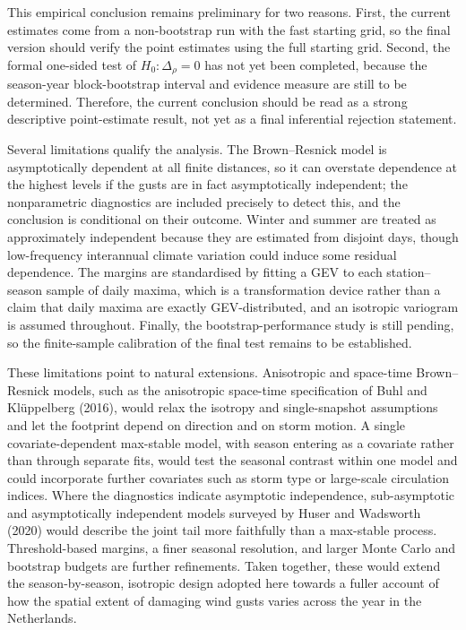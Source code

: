 This empirical conclusion remains preliminary for two reasons. First, the current estimates come from a non-bootstrap run with the fast starting grid, so the final version should verify the point estimates using the full starting grid. Second, the formal one-sided test of \(H_0:\Delta_\rho=0\) has not yet been completed, because the season-year block-bootstrap interval and evidence measure are still to be determined. Therefore, the current conclusion should be read as a strong descriptive point-estimate result, not yet as a final inferential rejection statement.

Several limitations qualify the analysis. The Brown--Resnick model is asymptotically dependent at all finite distances, so it can overstate dependence at the highest levels if the gusts are in fact asymptotically independent; the nonparametric diagnostics are included precisely to detect this, and the conclusion is conditional on their outcome. Winter and summer are treated as approximately independent because they are estimated from disjoint days, though low-frequency interannual climate variation could induce some residual dependence. The margins are standardised by fitting a GEV to each station--season sample of daily maxima, which is a transformation device rather than a claim that daily maxima are exactly GEV-distributed, and an isotropic variogram is assumed throughout. Finally, the bootstrap-performance study is still pending, so the finite-sample calibration of the final test remains to be established.

These limitations point to natural extensions. Anisotropic and space-time Brown--Resnick models, such as the anisotropic space-time specification of Buhl and Kl\"uppelberg (2016), would relax the isotropy and single-snapshot assumptions and let the footprint depend on direction and on storm motion. A single covariate-dependent max-stable model, with season entering as a covariate rather than through separate fits, would test the seasonal contrast within one model and could incorporate further covariates such as storm type or large-scale circulation indices. Where the diagnostics indicate asymptotic independence, sub-asymptotic and asymptotically independent models surveyed by Huser and Wadsworth (2020) would describe the joint tail more faithfully than a max-stable process. Threshold-based margins, a finer seasonal resolution, and larger Monte Carlo and bootstrap budgets are further refinements. Taken together, these would extend the season-by-season, isotropic design adopted here towards a fuller account of how the spatial extent of damaging wind gusts varies across the year in the Netherlands.
